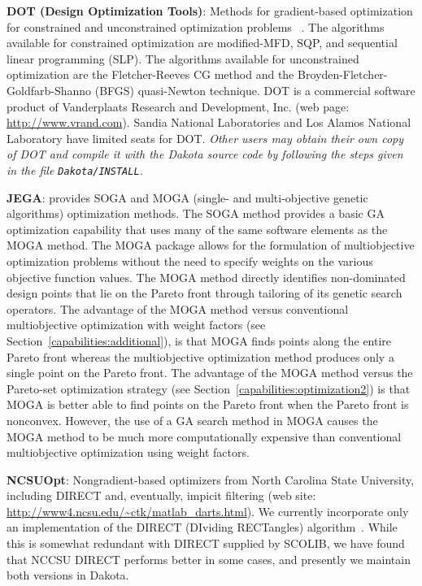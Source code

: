 \textbf{DOT (Design Optimization Tools)}: Methods for gradient-based
optimization for constrained and unconstrained optimization problems
~\cite{Van95}. The algorithms available for constrained optimization are
modified-MFD, SQP, and sequential linear programming (SLP). The
algorithms available for unconstrained optimization are the
Fletcher-Reeves CG method and the Broyden-Fletcher-Goldfarb-Shanno
(BFGS) quasi-Newton technique. DOT is a commercial software product of
Vanderplaats Research and Development, Inc. (web page:
\url{http://www.vrand.com}). Sandia National Laboratories and Los
Alamos National Laboratory have limited seats for DOT. \emph{Other
users may obtain their own copy of DOT and compile it with the Dakota
source code by following the steps given in the file {\tt Dakota/INSTALL}.}

\textbf{JEGA}: provides SOGA and MOGA (single- and multi-objective
genetic algorithms) optimization methods. The SOGA method provides a
basic GA optimization capability that uses many of the same software
elements as the MOGA method. The MOGA package allows for the
formulation of multiobjective optimization problems without the need
to specify weights on the various objective function values. The MOGA
method directly identifies non-dominated design points that lie on the
Pareto front through tailoring of its genetic search operators.  The
advantage of the MOGA method versus conventional multiobjective
optimization with weight factors (see
Section~\ref{capabilities:additional}), is that MOGA finds points
along the entire Pareto front whereas the multiobjective optimization
method produces only a single point on the Pareto front. The advantage
of the MOGA method versus the Pareto-set optimization strategy (see
Section~\ref{capabilities:optimization2}) is that MOGA is better able
to find points on the Pareto front when the Pareto front is
nonconvex. However, the use of a GA search method in MOGA causes the
MOGA method to be much more computationally expensive than
conventional multiobjective optimization using weight factors.


\textbf{NCSUOpt}: Nongradient-based optimizers from North Carolina
State University, including DIRECT and, eventually, impicit filtering
(web site: \url{http://www4.ncsu.edu/~ctk/matlab_darts.html}).  We
currently incorporate only an implementation of the DIRECT (DIviding
RECTangles) algorithm~\cite{Gab01}.  While this is somewhat redundant
with DIRECT supplied by SCOLIB, we have found that NCCSU DIRECT
performs better in some cases, and presently we maintain both versions
in Dakota.

